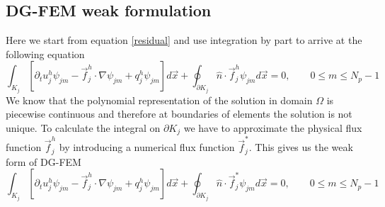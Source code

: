\documentclass[BoSSSForSolvingConservationLaws.tex]{subfiles}
\begin{document}
\subsection{DG-FEM weak formulation}
Here we start from equation \eqref{residual} and use integration by part to arrive at the following equation\\
\[
\int_{K_j} [\partial_t u_j^h \psi_{jm}-\vec{f}_j^h\cdot \nabla \psi_{jm} +q_j^h \psi_{jm}] d\vec{x}
+\oint_{\partial K_j} \hat{n}\cdot \vec{f}_j^h \psi_{jm} d\vec{x}=0, \qquad 0\leq m \leq N_p-1
\]
We know that the polynomial representation of the solution in domain $\Omega$ is piecewise continuous and therefore at boundaries of elements the solution is not unique. To calculate the integral on $\partial K_j$ we have to approximate the physical flux function $\vec{f}_j^h$ by introducing a numerical flux function $\vec{f}_j^*$. This gives us the weak form of DG-FEM\\
\begin{equation}
\label{WeakFormulation}
\int_{K_j} [\partial_t u_j^h \psi_{jm}-\vec{f}_j^h\cdot \nabla \psi_{jm} +q_j^h \psi_{jm}] d\vec{x}
+\oint_{\partial K_j} \hat{n}\cdot \vec{f}_j^* \psi_{jm} d\vec{x}=0, \qquad 0\leq m \leq N_p-1
\end{equation}
\end{document}

